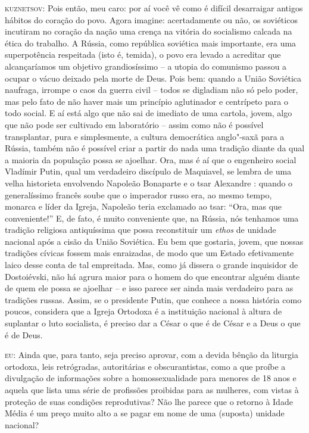 \textsc{kuznetsov:} Pois então, meu caro: por aí você vê como é difícil
desarraigar antigos hábitos do coração do povo. Agora imagine:
acertadamente ou não, os soviéticos incutiram no coração da nação uma
crença na vitória do socialismo calcada na ética do trabalho. A Rússia,
como república soviética mais importante, era uma superpotência
respeitada (isto é, temida), o povo era levado a acreditar que
alcançaríamos um objetivo grandiosíssimo -- a utopia do comunismo passou
a ocupar o vácuo deixado pela morte de Deus. Pois bem: quando a União
Soviética naufraga, irrompe o caos da guerra civil -- todos se digladiam
não só pelo poder, mas pelo fato de não haver mais um princípio
aglutinador e centrípeto para o todo social. E aí está algo que não sai
de imediato de uma cartola, jovem, algo que não pode ser cultivado em
laboratório -- assim como não é possível transplantar, pura e
simplesmente, a cultura democrática anglo"-saxã para a Rússia, também não
é possível criar a partir do nada uma tradição diante da qual a maioria
da população possa se ajoelhar. Ora, mas é aí que o engenheiro social
Vladímir Putin, qual um verdadeiro discípulo de Maquiavel, se lembra de
uma velha historieta envolvendo Napoleão Bonaparte e o tsar Alexandre :
quando o generalíssimo francês soube que o imperador russo era, ao mesmo
tempo, monarca e líder da Igreja, Napoleão teria exclamado ao tsar:
``Ora, mas que conveniente!'' E, de fato, é muito conveniente que, na
Rússia, nós tenhamos uma tradição religiosa antiquíssima que possa
reconstituir um \emph{ethos} de unidade nacional após a cisão da União
Soviética. Eu bem que gostaria, jovem, que nossas tradições cívicas
fossem mais enraizadas, de modo que um Estado efetivamente laico desse
conta de tal empreitada. Mas, como já dissera o grande inquisidor de
Dostoiévski, não há agrura maior para o homem do que encontrar alguém
diante de quem ele possa se ajoelhar -- e isso parece ser ainda mais
verdadeiro para as tradições russas. Assim, se o presidente Putin, que
conhece a nossa história como poucos, considera que a Igreja Ortodoxa é
a instituição nacional à altura de suplantar o luto socialista, é
preciso dar a César o que é de César e a Deus o que é de Deus.

\textsc{eu:} Ainda que, para tanto, seja preciso aprovar, com a devida
bênção da liturgia ortodoxa, leis retrógradas, autoritárias e
obscurantistas, como a que proíbe a divulgação de informações sobre a
homossexualidade para menores de 18 anos e aquela que lista uma série de
profissões proibidas para as mulheres, com vistas à proteção de suas
condições reprodutivas? Não lhe parece que o retorno à Idade Média é um
preço muito alto a se pagar em nome de uma (suposta) unidade nacional?

